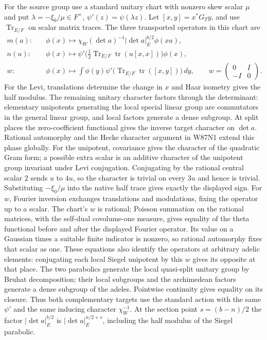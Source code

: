 For the source group use a standard unitary chart with nonzero skew
scalar $\mu$ and put $\lambda=-\xi_0/\mu\in F^\times$,
$\psi'(z)=\psi(\lambda z)$. Let
$[x,y]=x^*G_Ty$, and use $\operatorname{Tr}_{E/F}$ on scalar
matrix traces. The three transported operators in this chart are
\begin{align*}
 m(a):\quad&\phi(x)\longmapsto
       \chi_W(\det a)^{-1}|\det a|_E^{b/2}\phi(xa),\\
 n(u):\quad&\phi(x)\longmapsto
       \psi'\bigl(\tfrac12\operatorname{Tr}_{E/F}
                   \operatorname{tr}(u[x,x])\bigr)\phi(x),\\
 w:\quad&\phi(x)\longmapsto
       \int\phi(y)\psi'\bigl(\operatorname{Tr}_{E/F}
                   \operatorname{tr}([x,y])\bigr)\,dy ,
       \qquad w=\begin{pmatrix}0&I\\-I&0\end{pmatrix}.
\end{align*}
For the Levi, translations determine the change in $x$ and Haar
isometry gives the half modulus. The remaining unitary character
factors through the determinant: elementary unipotents generating
the local special linear group are commutators in the general
linear group, and local factors generate a dense subgroup. At
split places the zero-coefficient functional gives the inverse
target character on $\det a$. Rational automorphy and the Hecke
character argument in W87N1 extend this phase globally.
For the unipotent, covariance gives the character of the quadratic
Gram form; a possible extra scalar is an additive character of the
unipotent group invariant under Levi conjugation. Conjugating by
the rational central scalar $2$ sends $u$ to $4u$, so the character
is trivial on every $3u$ and hence is trivial. Substituting
$-\xi_0/\mu$ into the native half trace gives exactly the displayed
sign. For $w$, Fourier inversion exchanges translations and
modulations, fixing the operator up to a scalar. The chart's $w$
is rational; Poisson summation on the rational matrices, with the
self-dual covolume-one measure, gives equality of the theta
functional before and after the displayed Fourier operator. Its
value on a Gaussian times a suitable finite indicator is nonzero,
so rational automorphy fixes that scalar as one. These equations
also identify the operators at arbitrary adelic elements:
conjugating each local Siegel unipotent by this $w$ gives its
opposite at that place. The two parabolics generate the local
quasi-split unitary group by Bruhat decomposition; their local
subgroups and the archimedean factors generate a dense subgroup
of the adeles. Pointwise continuity gives equality on its closure.
Thus both complementary targets use the standard action with the
same $\psi'$ and the same inducing character $\chi_W^{-1}$.
At the section point $s=(b-n)/2$ the factor
$|\det a|_E^{b/2}$ is $|\det a|_E^{n/2+s}$, including the
half modulus of the Siegel parabolic.

